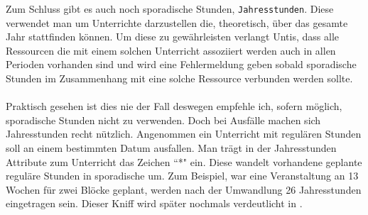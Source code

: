 Zum Schluss gibt es auch noch sporadische Stunden, \texttt{Jahresstunden}. Diese verwendet man um Unterrichte darzustellen die, theoretisch, über das gesamte Jahr stattfinden können. Um diese zu gewährleisten verlangt Untis, dass alle Ressourcen die mit einem solchen Unterricht assoziiert werden auch in allen Perioden vorhanden sind und wird eine Fehlermeldung geben sobald sporadische Stunden im Zusammenhang mit eine solche Ressource verbunden werden sollte.\\
\\
Praktisch gesehen ist dies nie der Fall deswegen empfehle ich, sofern möglich, sporadische Stunden nicht zu verwenden. Doch bei Ausfälle machen sich Jahresstunden recht nützlich. Angenommen ein Unterricht mit regulären Stunden soll an einem bestimmten Datum ausfallen. Man trägt in der Jahresstunden Attribute zum Unterricht das Zeichen ``*" \hspace{1pt} ein. Diese wandelt vorhandene geplante reguläre Stunden in sporadische um. Zum Beispiel, war eine Veranstaltung an 13 Wochen für zwei Blöcke geplant, werden nach der Umwandlung 26 Jahresstunden eingetragen sein. Dieser Kniff wird später nochmals verdeutlicht in .



















